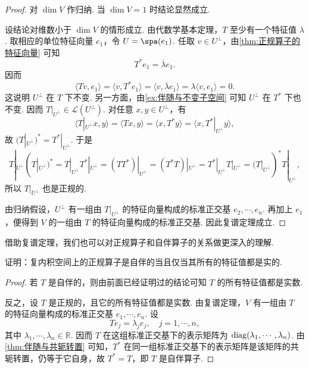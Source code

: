 \begin{proof}
    对 $ \dim V $ 作归纳. 当 $ \dim V = 1 $ 时结论显然成立.

    设结论对维数小于 $ \dim V $ 的情形成立. 由代数学基本定理，$ T $ 至少有一个特征值 $ \lambda $. 取相应的单位特征向量 $ e_1 $，令 $ U = \spa(e_1) $. 任取 $ v \in U^\perp $，由\autoref{thm:正规算子的特征向量} 可知
    \[
        T^* e_1 = \overline{\lambda} e_1.
    \]
    因而
    \[
        \langle Tv, e_1 \rangle = \langle v, T^* e_1 \rangle = \langle v, \overline{\lambda} e_1 \rangle = \lambda \langle v, e_1 \rangle = 0.
    \]
    这说明 $ U^\perp $ 在 $ T $ 下不变. 另一方面，由\autoref{ex:伴随与不变子空间} 可知 $ U^\perp $ 在 $ T^* $ 下也不变. 因而 $ T|_{U^\perp} \in \mathcal{L}(U^\perp) $. 对任意 $ x, y \in U^\perp $，有
    \[
        \langle T|_{U^\perp} x, y \rangle = \langle Tx, y \rangle = \langle x, T^* y \rangle = \langle x, T^*|_{U^\perp} y \rangle,
    \]
    故 $ (T|_{U^\perp})^* = T^*|_{U^\perp} $. 于是
    \[
        T|_{U^\perp}(T|_{U^\perp})^* = T|_{U^\perp} T^*|_{U^\perp} = (TT^*)|_{U^\perp} = (T^*T)|_{U^\perp} = T^*|_{U^\perp} T|_{U^\perp} = (T|_{U^\perp})^* T|_{U^\perp},
    \]
    所以 $ T|_{U^\perp} $ 也是正规的.

    由归纳假设，$ U^\perp $ 有一组由 $ T|_{U^\perp} $ 的特征向量构成的标准正交基 $ e_2, \cdots, e_n $. 再加上 $ e_1 $，便得到 $ V $ 的一组由 $ T $ 的特征向量构成的标准正交基. 因此复谱定理成立.
\end{proof}

借助复谱定理，我们也可以对正规算子和自伴算子的关系做更深入的理解.

\begin{example}{}{}
    证明：复内积空间上的正规算子是自伴的当且仅当其所有的特征值都是实的.
\end{example}

\begin{proof}
    若 $ T $ 是自伴的，则由前面已经证明过的结论可知 $ T $ 的所有特征值都是实数.

    反之，设 $ T $ 是正规的，且它的所有特征值都是实数. 由复谱定理，$ V $ 有一组由 $ T $ 的特征向量构成的标准正交基 $ e_1, \cdots, e_n $. 设
    \[
        T e_j = \lambda_j e_j, \quad j = 1, \cdots, n,
    \]
    其中 $ \lambda_1, \cdots, \lambda_n \in \mathbb{R} $. 因而 $ T $ 在这组标准正交基下的表示矩阵为 $\operatorname{diag}(\lambda_1, \cdots, \lambda_n)$. 由\autoref{thm:伴随与共轭转置} 可知，$ T^* $ 在同一组标准正交基下的表示矩阵是该矩阵的共轭转置，仍等于它自身，故 $ T^* = T $，即 $ T $ 是自伴算子.
\end{proof}

